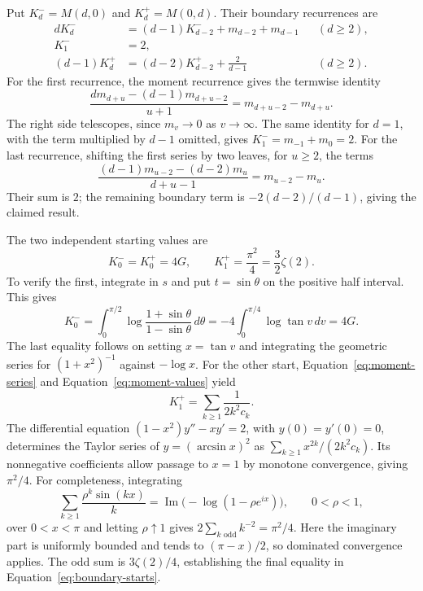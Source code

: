 Put $K^-_d=M(d,0)$ and $K^+_d=M(0,d)$. Their boundary recurrences are
\begin{equation}\label{eq:boundary-recurrences}
\begin{aligned}
dK^-_d&=(d-1)K^-_{d-2}+m_{d-2}+m_{d-1} &&(d\ge2),\\
K^-_1&=2,\\
(d-1)K^+_d&=(d-2)K^+_{d-2}+\frac{2}{d-1} &&(d\ge2).
\end{aligned}
\end{equation}
For the first recurrence, the moment recurrence gives the termwise identity
\[
\frac{d m_{d+u}-(d-1)m_{d+u-2}}{u+1}
=m_{d+u-2}-m_{d+u}.
\]
The right side telescopes, since $m_v\to0$ as $v\to\infty$.
The same identity for $d=1$, with the term multiplied by $d-1$ omitted,
gives $K^-_1=m_{-1}+m_0=2$. For the last recurrence, shifting the
first series by two leaves, for $u\ge2$, the terms
\[
\frac{(d-1)m_{u-2}-(d-2)m_u}{d+u-1}=m_{u-2}-m_u.
\]
Their sum is $2$; the remaining boundary term is
$-2(d-2)/(d-1)$, giving the claimed result.

The two independent starting values are
\begin{equation}\label{eq:boundary-starts}
K^-_0=K^+_0=4G,\qquad K^+_1=\frac{\pi^2}{4}=\frac32\zeta(2).
\end{equation}
To verify the first, integrate in $s$ and put $t=\sin\theta$ on the
positive half interval. This gives
\[
K^-_0=\int_0^{\pi/2}\log\frac{1+\sin\theta}{1-\sin\theta}\,d\theta
=-4\int_0^{\pi/4}\log\tan v\,dv=4G.
\]
The last equality follows on setting $x=\tan v$ and integrating the
geometric series for $(1+x^2)^{-1}$ against $-\log x$.
For the other start, Equation~\eqref{eq:moment-series} and
Equation~\eqref{eq:moment-values} yield
\[
K^+_1=\sum_{k\ge1}\frac{1}{2k^2c_k}.
\]
The differential equation
$(1-x^2)y''-xy'=2$, with $y(0)=y'(0)=0$, determines the Taylor
series of $y=(\arcsin x)^2$ as
$\sum_{k\ge1}x^{2k}/(2k^2c_k)$. Its nonnegative coefficients allow
passage to $x=1$ by monotone convergence, giving $\pi^2/4$.
For completeness, integrating
\[
\sum_{k\ge1}\frac{\rho^k\sin(kx)}{k}
=\operatorname{Im}\bigl(-\log(1-\rho e^{ix})\bigr),\qquad0<\rho<1,
\]
over $0<x<\pi$ and letting $\rho\uparrow1$ gives
$2\sum_{k\text{ odd}}k^{-2}=\pi^2/4$.
Here the imaginary part is uniformly bounded and tends to $(\pi-x)/2$,
so dominated convergence applies. The odd sum is $3\zeta(2)/4$,
establishing the final equality in Equation~\eqref{eq:boundary-starts}.

